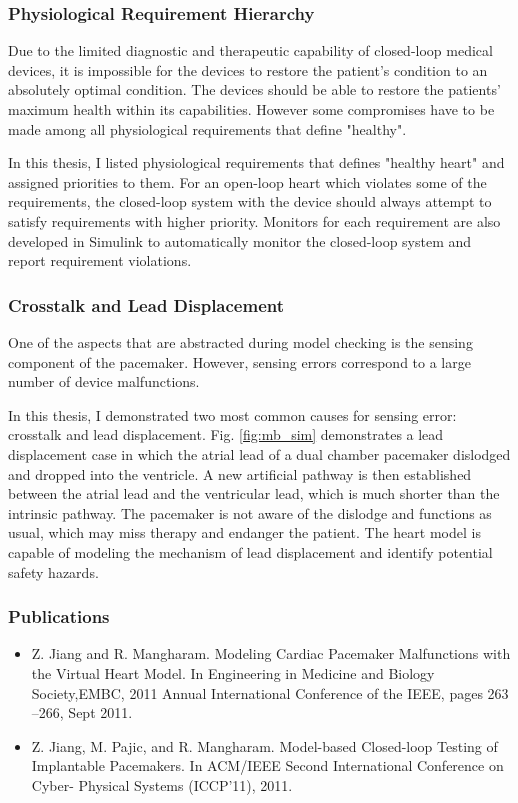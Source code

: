 \documentclass[a4paper]{article}
\begin{document}
\subsubsection{Physiological Requirement Hierarchy}
Due to the limited diagnostic and therapeutic capability of closed-loop medical devices, it is impossible for the devices to restore the patient's condition to an absolutely optimal condition.
The devices should be able to restore the patients' maximum health within its capabilities.
However some compromises have to be made among all physiological requirements that define "healthy". 

In this thesis, I listed physiological requirements that defines "healthy heart" and assigned priorities to them.
For an open-loop heart which violates some of the requirements, the closed-loop system with the device should always attempt to satisfy requirements with higher priority.
Monitors for each requirement are also developed in Simulink to automatically monitor the closed-loop system and report requirement violations.
\subsubsection{Crosstalk and Lead Displacement}
One of the aspects that are abstracted during model checking is the sensing component of the pacemaker.
However, sensing errors correspond to a large number of device malfunctions.

In this thesis, I demonstrated two most common causes for sensing error: crosstalk and lead displacement.
Fig. \ref{fig:mb_sim} demonstrates a lead displacement case in which the atrial lead of a dual chamber pacemaker dislodged and dropped into the ventricle.
A new artificial pathway is then established between the atrial lead and the ventricular lead, which is much shorter than the intrinsic pathway.
The pacemaker is not aware of the dislodge and functions as usual, which may miss therapy and endanger the patient.
The heart model is capable of modeling the mechanism of lead displacement and identify potential safety hazards.
\subsubsection{Publications}
\begin{itemize}
\item Z. Jiang and R. Mangharam. Modeling Cardiac Pacemaker Malfunctions with the
Virtual Heart Model. In Engineering in Medicine and Biology Society,EMBC,
2011 Annual International Conference of the IEEE, pages 263 –266, Sept 2011.
\item Z. Jiang, M. Pajic, and R. Mangharam. Model-based Closed-loop Testing of Implantable Pacemakers. In ACM/IEEE Second International Conference on Cyber-
Physical Systems (ICCP’11), 2011.
\end{itemize}
\newpage
\end{document}
